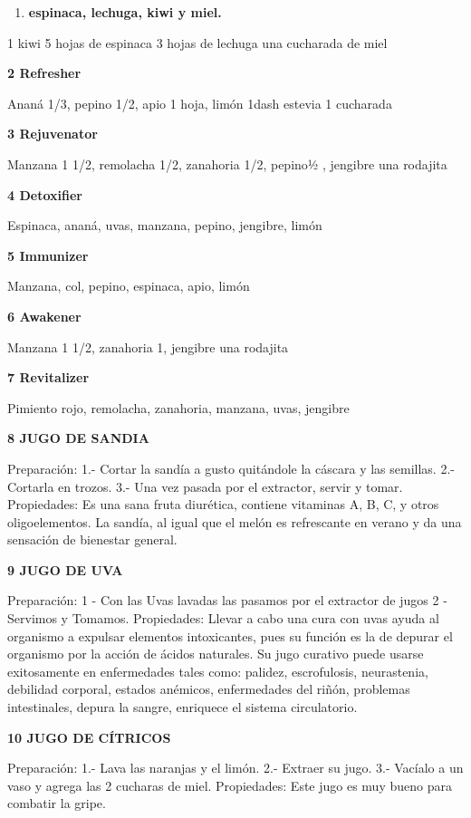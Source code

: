 \begin{enumerate}
\def\labelenumi{\arabic{enumi}.}
\tightlist
\item
  \textbf{espinaca, lechuga, kiwi y miel.}
\end{enumerate}

1 kiwi 5 hojas de espinaca 3 hojas de lechuga una cucharada de miel

\textbf{2 Refresher}

Ananá 1/3, pepino 1/2, apio 1 hoja, limón 1dash estevia 1 cucharada

\textbf{3 Rejuvenator}

Manzana 1 1/2, remolacha 1/2, zanahoria 1/2, pepino½ , jengibre una
rodajita

\textbf{4 Detoxifier}

Espinaca, ananá, uvas, manzana, pepino, jengibre, limón

\textbf{5 Immunizer}

Manzana, col, pepino, espinaca, apio, limón

\textbf{6 Awakener}

Manzana 1 1/2, zanahoria 1, jengibre una rodajita

\textbf{7 Revitalizer}

Pimiento rojo, remolacha, zanahoria, manzana, uvas, jengibre

\textbf{8 JUGO DE SANDIA }

Preparación: 1.- Cortar la sandía a gusto quitándole la cáscara y las
semillas. 2.- Cortarla en trozos. 3.- Una vez pasada por el extractor,
servir y tomar. Propiedades: Es una sana fruta diurética, contiene
vitaminas A, B, C, y otros oligoelementos. La sandía, al igual que el
melón es refrescante en verano y da una sensación de bienestar general.

\textbf{9 JUGO DE UVA}

Preparación: 1 - Con las Uvas lavadas las pasamos por el extractor de
jugos 2 - Servimos y Tomamos. Propiedades: Llevar a cabo una cura con
uvas ayuda al organismo a expulsar elementos intoxicantes, pues su
función es la de depurar el organismo por la acción de ácidos naturales.
Su jugo curativo puede usarse exitosamente en enfermedades tales como:
palidez, escrofulosis, neurastenia, debilidad corporal, estados
anémicos, enfermedades del riñón, problemas intestinales, depura la
sangre, enriquece el sistema circulatorio.

\textbf{10 JUGO DE CÍTRICOS}

Preparación: 1.- Lava las naranjas y el limón. 2.- Extraer su jugo. 3.-
Vacíalo a un vaso y agrega las 2 cucharas de miel. Propiedades: Este
jugo es muy bueno para combatir la gripe.

